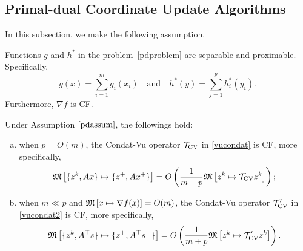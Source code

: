 {{\subsection{Primal-dual Coordinate Update Algorithms}\label{sec:pdcu}
In this subsection, we make the following assumption.
\begin{assumption}
Functions $g$ and $h^*$ in the problem~\eqref{pdproblem} are separable and proximable. Specifically, $$g(x)=\displaystyle\sum_{i=1} ^m g_i(x_i)\quad\mbox{and}\quad h^*(y)=\displaystyle\sum_{j=1}^ph^*_i(y_i).$$\label{pdassum}
Furthermore, $\nabla f$ is CF.
\end{assumption}
\begin{proposition}\DIFaddbegin \label{prop1}
\DIFaddend Under Assumption $\ref{pdassum}$, the followings hold:
\begin{enumerate}[(a)]
\item when $p=O(m)$, the Condat-Vu operator ${{\mathcal{T}}_{\textnormal{CV}}}$ in \eqref{vucondat} is CF, more specifically, $$\mathfrak{M}\left[{\{z^k,Ax\}}\mapsto {\{z^+,Ax^+\}}\right]=O\left(\frac{1}{m+p}\mathfrak{M}\left[{z^k}\mapsto {{{\mathcal{T}}_{\textnormal{CV}}}z^k}\right]\right);$$ 
\item when $m\ll p$ and $\mathfrak{M}\left[{x}\mapsto {\nabla f(x)}\right]=O(m)$, the Condat-Vu operator ${\mathcal{T}}'_\textnormal{CV}$ in \eqref{vucondat2} is CF, more specifically, $$\mathfrak{M}\left[{\{z^k,A^\top s\}}\mapsto {\{z^+,A^\top s^+\}}\right]=O\left(\frac{1}{m+p}\mathfrak{M}\left[{z^k}\mapsto {{\mathcal{T}}'_{\textnormal{CV}} z^k}\right]\right).$$
\end{enumerate}
\end{proposition}

}}
